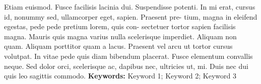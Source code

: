 Etiam euismod. Fusce facilisis lacinia dui. Suspendisse potenti. In mi erat, cursus id, nonummy sed, ullamcorper eget, sapien. Praesent pre- tium, magna in eleifend egestas, pede pede pretium lorem, quis con- sectetuer tortor sapien facilisis magna. Mauris quis magna varius nulla scelerisque imperdiet. Aliquam non quam. Aliquam porttitor quam a lacus. Praesent vel arcu ut tortor cursus volutpat. In vitae pede quis diam bibendum placerat. Fusce elementum convallis neque. Sed dolor orci, scelerisque ac, dapibus nec, ultricies ut, mi. Duis nec dui quis leo sagittis commodo.
\vfill
\textbf{Keywords:} Keyword 1; Keyword 2; Keyword 3